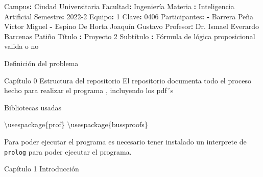 \documentclass[
  ignorenonframetext,
]{beamer}
\author{}
\date{}
\newenvironment{Shaded}{}{}
\newcommand{\AttributeTok}[1]{\textcolor[rgb]{0.49,0.56,0.16}{#1}}
\newcommand{\DecValTok}[1]{\textcolor[rgb]{0.25,0.63,0.44}{#1}}
\newcommand{\FunctionTok}[1]{\textcolor[rgb]{0.02,0.16,0.49}{#1}}
\newcommand{\KeywordTok}[1]{\textcolor[rgb]{0.00,0.44,0.13}{\textbf{#1}}}
\newcommand{\NormalTok}[1]{#1}
\begin{document}
\begin{frame}[fragile]
\begin{Shaded}
\begin{Highlighting}[]
\FunctionTok{Campus}\KeywordTok{:}\AttributeTok{ Ciudad Universitaria}
\FunctionTok{Facultad}\KeywordTok{:}\AttributeTok{ Ingeniería}
\FunctionTok{Materia }\KeywordTok{:}\AttributeTok{ Inteligencia Artificial}
\FunctionTok{Semestre}\KeywordTok{:}\AttributeTok{ 2022{-}2}
\FunctionTok{Equipo}\KeywordTok{:}\AttributeTok{ }\DecValTok{1}
\FunctionTok{Clave}\KeywordTok{:}\AttributeTok{ }\DecValTok{0406}
\FunctionTok{Participantes}\KeywordTok{:}\AttributeTok{ }
\AttributeTok{    }\KeywordTok{{-}}\AttributeTok{ Barrera Peña Víctor Miguel}
\AttributeTok{    }\KeywordTok{{-}}\AttributeTok{ Espino De Horta Joaquín Gustavo}
\AttributeTok{    }
\FunctionTok{Profesor}\KeywordTok{:}\AttributeTok{ Dr. Ismael Everardo Barcenas Patiño}
\FunctionTok{Título }\KeywordTok{:}\AttributeTok{ Proyecto 2}
\FunctionTok{Subtítulo }\KeywordTok{:}\AttributeTok{ Fórmula de lógica proposicional valida o no}
\end{Highlighting}
\end{Shaded}
\end{frame}

\begin{frame}{Definición del problema}
\protect\hypertarget{definiciuxf3n-del-problema}{}
\end{frame}

\begin{frame}[fragile]{Capítulo 0 Estructura del repositorio}
\protect\hypertarget{capuxedtulo-0-estructura-del-repositorio}{}
El repositorio documenta todo el proceso hecho para realizar el programa
, incluyendo los pdf´s

\begin{block}{Bibliotecas usadas}
\protect\hypertarget{bibliotecas-usadas}{}
\begin{Shaded}
\begin{Highlighting}[]
\FunctionTok{\textbackslash{}usespackage}\NormalTok{\{prof\}}
\FunctionTok{\textbackslash{}usespackage}\NormalTok{\{bussproofs\}}
\end{Highlighting}
\end{Shaded}

Para poder ejecutar el programa es necesario tener instalado un
interprete de \texttt{prolog} para poder ejecutar el programa.
\end{block}
\end{frame}

\begin{frame}{Capítulo 1 Introducción}
\protect\hypertarget{capuxedtulo-1-introducciuxf3n}{}
\end{frame}
\end{document}

